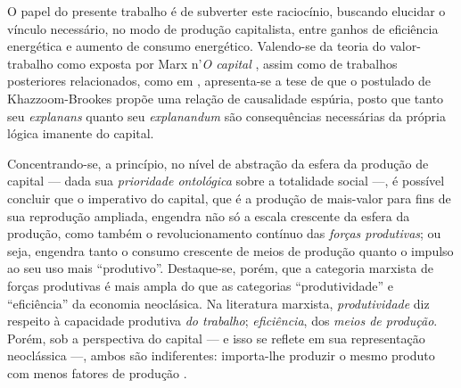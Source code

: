 \documentclass[12pt]{article}
\begin{document}
O papel do presente trabalho é de subverter este raciocínio, buscando elucidar o vínculo necessário, no modo de produção capitalista, entre ganhos de eficiência energética e aumento de consumo energético. Valendo-se da teoria do valor-trabalho como exposta por Marx n'\textit{O capital} \parencite{Marx2017, Marx2014, Marx2017a}, assim como de trabalhos posteriores relacionados, como em \textcite{SaBarreto2018,SaBarreto2022}, apresenta-se a tese de que o postulado de Khazzoom-Brookes propõe uma relação de causalidade espúria, posto que tanto seu \textit{explanans} quanto seu \textit{explanandum} são consequências necessárias da própria lógica imanente do capital. 

Concentrando-se, a princípio, no nível de abstração da esfera da produção de capital --- dada sua \textit{prioridade ontológica} sobre a totalidade social \parencite{Lukacs2012,Lukacs2018} ---, é possível concluir que o imperativo do capital, que é a produção de mais-valor para fins de sua reprodução ampliada, engendra não só a escala crescente da esfera da produção, como também o revolucionamento contínuo das \textit{forças produtivas}; ou seja, engendra tanto o consumo crescente de meios de produção quanto o impulso ao seu uso mais ``produtivo''. Destaque-se, porém, que a categoria marxista de forças produtivas é mais ampla do que as categorias ``produtividade'' e ``eficiência'' da economia neoclásica. Na literatura marxista, \textit{produtividade} diz respeito à capacidade produtiva \textit{do trabalho}; \textit{eficiência}, dos \textit{meios de produção}. Porém, sob a perspectiva do capital --- e isso se reflete em sua representação neoclássica ---, ambos são indiferentes: importa-lhe produzir o mesmo produto com menos fatores de produção \parencite{SaBarreto2018,SaBarreto2022,Marx2017}. 


\end{document}

